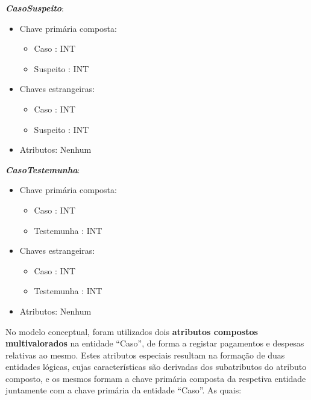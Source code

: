 \documentclass[a4paper,12pt]{scrreprt}
\begin{document}
        \textbf{\textit{CasoSuspeito}}:
        \begin{itemize}
            \item Chave primária composta:
                \begin{itemize}
                    \item Caso : INT
                    \item Suspeito : INT
                \end{itemize}
            \item Chaves estrangeiras:
                \begin{itemize}
                    \item Caso : INT
                    \item Suspeito : INT
                \end{itemize}
            \item Atributos: Nenhum
        \end{itemize}

        \vspace{0.5cm}            
        
        \textbf{\textit{CasoTestemunha}}:
        \begin{itemize}
            \item Chave primária composta:
                \begin{itemize}
                    \item Caso : INT
                    \item Testemunha : INT
                \end{itemize}
            \item Chaves estrangeiras:
                \begin{itemize}
                    \item Caso : INT
                    \item Testemunha : INT
                \end{itemize}
            \item Atributos: Nenhum
        \end{itemize}

        \clearpage

        No modelo conceptual, foram utilizados dois \textbf{atributos compostos multivalorados} na entidade “Caso”, de forma a registar pagamentos e despesas relativas ao mesmo. Estes atributos especiais resultam na formação de duas entidades lógicas, cujas características são derivadas dos subatributos do atributo composto, e os mesmos formam a chave primária composta da respetiva entidade juntamente com a chave primária da entidade “Caso”. As quais:
        
\end{document}
